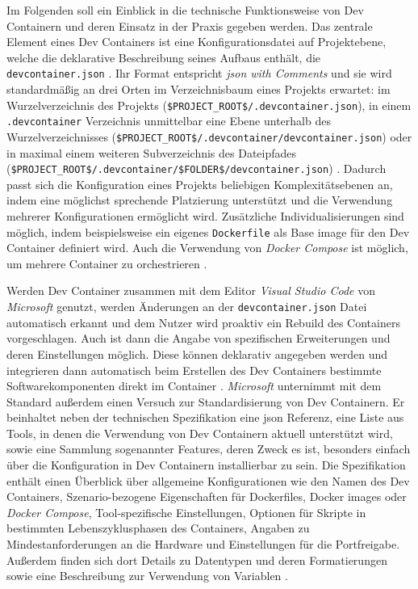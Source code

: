 Im Folgenden soll ein Einblick in die technische Funktionsweise von Dev Containern und deren Einsatz in der Praxis gegeben werden. Das zentrale Element eines Dev Containers ist eine Konfigurationsdatei auf Projektebene, welche die deklarative Beschreibung seines Aufbaus enthält, die \texttt{devcontainer.json} \cite{202:Maximizing-Efficiency-with-Dev-Containers}. Ihr Format entspricht \textit{\Gls{json} with Comments} und sie wird standardmäßig an drei Orten im Verzeichnisbaum eines Projekts erwartet: im Wurzelverzeichnis des Projekts (\texttt{\$PROJECT\_ROOT\$/.devcontainer.json}), in einem \texttt{.devcontainer} Verzeichnis unmittelbar eine Ebene unterhalb des Wurzelverzeichnisses (\texttt{\$PROJECT\_ROOT\$/.devcontainer/devcontainer.json}) oder in maximal einem weiteren Subverzeichnis des Dateipfades (\texttt{\$PROJECT\_ROOT\$/.devcontainer/\$FOLDER\$/devcontainer.json}) \cite{204:Development-Containers-Simplified,303:Introduction-to-DevContainers,305:Using-DevContainers-in-JetBrains-IDEs}. Dadurch passt sich die Konfiguration eines Projekts beliebigen Komplexitätsebenen an, indem eine möglichst sprechende Platzierung unterstützt und die Verwendung mehrerer Konfigurationen ermöglicht wird. Zusätzliche Individualisierungen sind möglich, indem beispielsweise ein eigenes \texttt{Dockerfile} als Base \Gls{image} für den Dev Container definiert wird. Auch die Verwendung von \textit{Docker Compose} ist möglich, um mehrere Container zu orchestrieren \cite{202:Maximizing-Efficiency-with-Dev-Containers}.

Werden Dev Container zusammen mit dem Editor \textit{Visual Studio Code} von \textit{Microsoft} genutzt, werden Änderungen an der \texttt{devcontainer.json} Datei automatisch erkannt und dem Nutzer wird proaktiv ein Rebuild des Containers vorgeschlagen. Auch ist dann die Angabe von spezifischen Erweiterungen und deren Einstellungen möglich. Diese können deklarativ angegeben werden und integrieren dann automatisch beim Erstellen des Dev Containers bestimmte Softwarekomponenten direkt im Container \cite{201:How-to-develop-with-Dev-Containers}. \textit{Microsoft} unternimmt mit dem  Standard außerdem einen Versuch zur Standardisierung von Dev Containern. Er beinhaltet neben der technischen Spezifikation eine \Gls{json} Referenz, eine Liste aus Tools, in denen die Verwendung von Dev Containern aktuell unterstützt wird, sowie eine Sammlung sogenannter Features, deren Zweck es ist, besonders einfach über die Konfiguration in Dev Containern installierbar zu sein. Die Spezifikation enthält einen Überblick über allgemeine Konfigurationen wie den Namen des Dev Containers, Szenario-bezogene Eigenschaften für Dockerfiles, Docker \Glspl{image} oder \textit{Docker Compose}, Tool-spezifische Einstellungen, Optionen für Skripte in bestimmten Lebenszyklusphasen des Containers, Angaben zu Mindestanforderungen an die Hardware und Einstellungen für die Portfreigabe. Außerdem finden sich dort Details zu Datentypen und deren Formatierungen sowie eine Beschreibung zur Verwendung von Variablen \cite{306:Development-Containers}.

